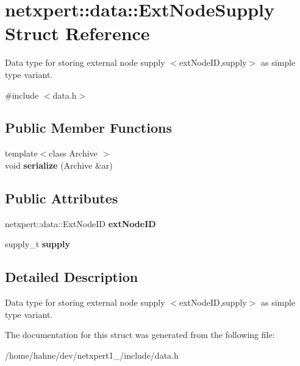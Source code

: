 \hypertarget{structnetxpert_1_1data_1_1ExtNodeSupply}{}\section{netxpert\+:\+:data\+:\+:Ext\+Node\+Supply Struct Reference}
\label{structnetxpert_1_1data_1_1ExtNodeSupply}


Data type for storing external node supply $<$ext\+Node\+ID,supply$>$ as simple type variant.  




{\ttfamily \#include $<$data.\+h$>$}

\subsection*{Public Member Functions}
\begin{DoxyCompactItemize}
\item 
{\footnotesize template$<$class Archive $>$ }\\void {\bfseries serialize} (Archive \&ar)\hypertarget{structnetxpert_1_1data_1_1ExtNodeSupply_a8cd30e2dd02383ac4530d68fe4c9d891}{}\label{structnetxpert_1_1data_1_1ExtNodeSupply_a8cd30e2dd02383ac4530d68fe4c9d891}

\end{DoxyCompactItemize}
\subsection*{Public Attributes}
\begin{DoxyCompactItemize}
\item 
netxpert\+::data\+::\+Ext\+Node\+ID {\bfseries ext\+Node\+ID}\hypertarget{structnetxpert_1_1data_1_1ExtNodeSupply_aaeff38c797587121ef750f7959995cd1}{}\label{structnetxpert_1_1data_1_1ExtNodeSupply_aaeff38c797587121ef750f7959995cd1}

\item 
supply\+\_\+t {\bfseries supply}\hypertarget{structnetxpert_1_1data_1_1ExtNodeSupply_a78243186ee0efdb852709054f2b21074}{}\label{structnetxpert_1_1data_1_1ExtNodeSupply_a78243186ee0efdb852709054f2b21074}

\end{DoxyCompactItemize}


\subsection{Detailed Description}
Data type for storing external node supply $<$ext\+Node\+ID,supply$>$ as simple type variant. 

The documentation for this struct was generated from the following file\+:\begin{DoxyCompactItemize}
\item 
/home/hahne/dev/netxpert1\+\_/include/data.\+h\end{DoxyCompactItemize}
